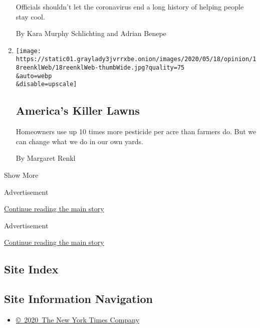 \begin{enumerate}
  Officials shouldn't let the coronavirus end a long history of helping
  people stay cool.

  By Kara Murphy Schlichting and Adrian Benepe
\item
  \href{/2020/05/18/opinion/lawn-pesticides-insect-extinction.html}{}

  \texttt{[image: https://static01.graylady3jvrrxbe.onion/images/2020/05/18/opinion/18reenklWeb/18reenklWeb-thumbWide.jpg?quality=75\\\&auto=webp\\\&disable=upscale]}

  \hypertarget{americas-killer-lawns}{%
  \subsection{America's Killer Lawns}\label{americas-killer-lawns}}

  Homeowners use up 10 times more pesticide per acre than farmers do.
  But we can change what we do in our own yards.

  By Margaret Renkl
\end{enumerate}

Show More

Advertisement

\protect\hyperlink{after-mid1}{Continue reading the main story}

Advertisement

\protect\hyperlink{after-mktg}{Continue reading the main story}

\hypertarget{site-index}{%
\subsection{Site Index}\label{site-index}}

\hypertarget{site-information-navigation}{%
\subsection{Site Information
Navigation}\label{site-information-navigation}}

\begin{itemize}
\tightlist
\item
  \href{https://help.nytimes3xbfgragh.onion/hc/en-us/articles/115014792127-Copyright-notice}{©~2020~The
  New York Times Company}
\end{itemize}

